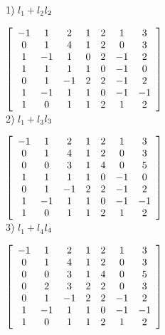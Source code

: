 \documentclass{article}
\begin{document}
1) $l_{1} + l_{2} $\to$ l_{2}\\
\newline$

$\left[\begin{array}{ccccccc}
-1 &  1 &  2 &  1 &  2 &  1 &  3 \\
0  &  1 &  4 &  1 &  2 &  0 &  3 \\
1  & -1 &  1 &  0 &  2 & -1 &  2 \\ 
1  &  1 &  1 &  1 &  0 & -1 &  0 \\ 
0  &  1 & -1 &  2 &  2 & -1 &  2 \\ 
1  & -1 &  1 &  1 &  0 & -1 & -1 \\ 
1  &  0 &  1 &  1 &  2 &  1 &  2 \\ 
 \end{array}\right]\\
  \newline$\\
  
  
2) $l_{1} + l_{3} $\to$ l_{3}\\ 
\newline$

$\left[\begin{array}{ccccccc}
-1 &  1 &  2 &  1 &  2 &  1 &  3 \\
0  &  1 &  4 &  1 &  2 &  0 &  3 \\
0  &  0 &  3 &  1 &  4 &  0 &  5 \\ 
1  &  1 &  1 &  1 &  0 & -1 &  0 \\ 
0  &  1 & -1 &  2 &  2 & -1 &  2 \\ 
1  & -1 &  1 &  1 &  0 & -1 & -1 \\ 
1  &  0 &  1 &  1 &  2 &  1 &  2 \\ 
 \end{array}\right]\\
  \newline$\\
  
  3) $l_{1} + l_{4} $\to$ l_{4}\\ 
\newline$

$\left[\begin{array}{ccccccc}
-1 &  1 &  2 &  1 &  2 &  1 &  3 \\
0  &  1 &  4 &  1 &  2 &  0 &  3 \\
0  &  0 &  3 &  1 &  4 &  0 &  5 \\ 
0  &  2 &  3 &  2 &  2 &  0 &  3 \\ 
0  &  1 & -1 &  2 &  2 & -1 &  2 \\ 
1  & -1 &  1 &  1 &  0 & -1 & -1 \\ 
1  &  0 &  1 &  1 &  2 &  1 &  2 \\ 
 \end{array}\right]\\
  \newline$\\
\end{document}
